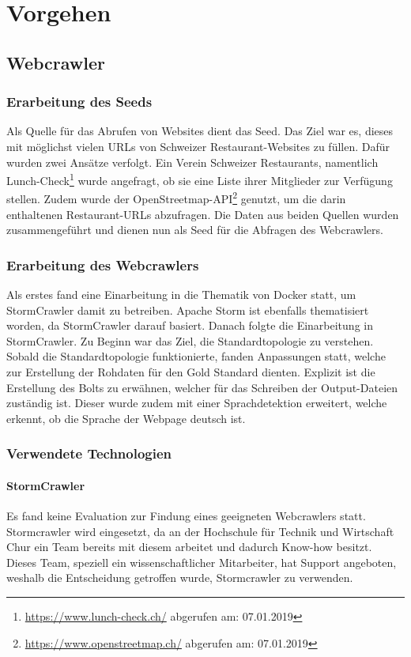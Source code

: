\chapter{Vorgehen}
\section{Webcrawler}
\subsection{Erarbeitung des Seeds}
Als Quelle für das Abrufen von Websites dient das Seed.
Das Ziel war es, dieses mit möglichst vielen URLs von Schweizer Restaurant-Websites zu füllen.
Dafür wurden zwei Ansätze verfolgt.
Ein Verein Schweizer Restaurants, namentlich Lunch-Check\footnote{\url{https://www.lunch-check.ch/} abgerufen am: 07.01.2019} wurde angefragt, ob sie eine Liste ihrer Mitglieder zur Verfügung stellen.
Zudem wurde der OpenStreetmap-API\footnote{\url{https://www.openstreetmap.ch/} abgerufen am: 07.01.2019} genutzt, um die darin enthaltenen Restaurant-URLs abzufragen.
Die Daten aus beiden Quellen wurden zusammengeführt und dienen nun als Seed für die Abfragen des Webcrawlers.
\subsection{Erarbeitung des Webcrawlers}
Als erstes fand eine Einarbeitung in die Thematik von Docker statt, um StormCrawler damit zu betreiben.
Apache Storm ist ebenfalls thematisiert worden, da StormCrawler darauf basiert.
Danach folgte die Einarbeitung in StormCrawler.
Zu Beginn war das Ziel, die Standardtopologie zu verstehen.
Sobald die Standardtopologie funktionierte, fanden Anpassungen statt, welche zur Erstellung der Rohdaten für den Gold Standard dienten.
Explizit ist die Erstellung des Bolts zu erwähnen, welcher für das Schreiben der Output-Dateien zuständig ist.
Dieser wurde zudem mit einer Sprachdetektion erweitert, welche erkennt, ob die Sprache der Webpage deutsch ist.
\subsection{Verwendete Technologien}
\subsubsection{StormCrawler}
Es fand keine Evaluation zur Findung eines geeigneten Webcrawlers statt.
Stormcrawler wird eingesetzt, da an der Hochschule für Technik und Wirtschaft Chur ein Team bereits mit diesem arbeitet und dadurch Know-how besitzt.
Dieses Team, speziell ein wissenschaftlicher Mitarbeiter, hat Support angeboten, weshalb die Entscheidung getroffen wurde, Stormcrawler zu verwenden.
